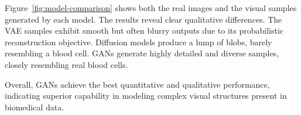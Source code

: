Figure~\ref{fig:model-comparison} shows both the real images and the visual samples generated by each model. The results reveal clear qualitative differences. The VAE samples exhibit smooth but often blurry outputs due to its probabilistic reconstruction objective. Diffusion models produce a lump of blobs, barely resembling a blood cell. GANs generate highly detailed and diverse samples, closely resembling real blood cells.

Overall, GANs achieve the best quantitative and qualitative performance, indicating superior capability in modeling complex visual structures present in biomedical data.
